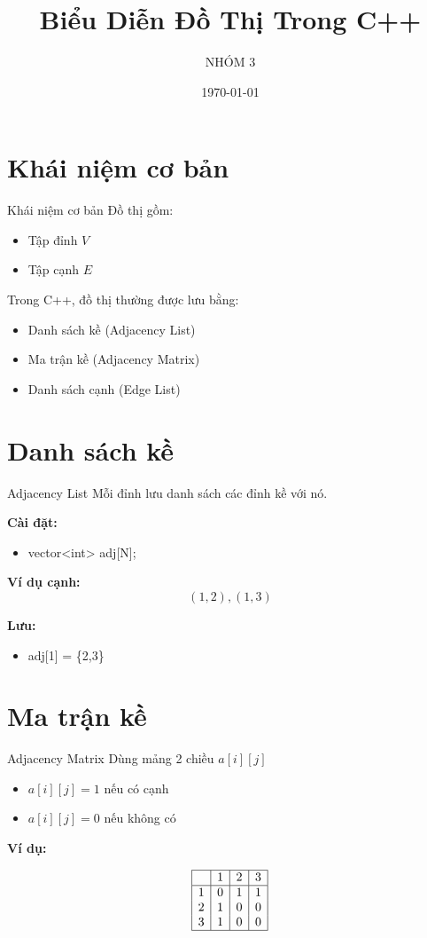 \documentclass{beamer}
\title{Biểu Diễn Đồ Thị Trong C++}
\author{NHÓM 3}
\date{\today}
\begin{document}
\frame{\titlepage}

\section{Khái niệm cơ bản}
\begin{frame}{Khái niệm cơ bản}
Đồ thị gồm:
\begin{itemize}
    \item Tập đỉnh $V$
    \item Tập cạnh $E$
\end{itemize}

Trong C++, đồ thị thường được lưu bằng:
\begin{itemize}
    \item Danh sách kề (Adjacency List)
    \item Ma trận kề (Adjacency Matrix)
    \item Danh sách cạnh (Edge List)
\end{itemize}
\end{frame}

\section{Danh sách kề}
\begin{frame}{Adjacency List}
Mỗi đỉnh lưu danh sách các đỉnh kề với nó.

\textbf{Cài đặt:}
\begin{itemize}
    \item vector<int> adj[N];
\end{itemize}

\textbf{Ví dụ cạnh:}
\[
(1,2), (1,3)
\]

\textbf{Lưu:}
\begin{itemize}
    \item adj[1] = \{2,3\}
\end{itemize}
\end{frame}

\section{Ma trận kề}
\begin{frame}{Adjacency Matrix}
Dùng mảng 2 chiều $a[i][j]$

\begin{itemize}
    \item $a[i][j] = 1$ nếu có cạnh
    \item $a[i][j] = 0$ nếu không có
\end{itemize}

\textbf{Ví dụ:}

\small
\[
\begin{array}{|c|c|c|c|}
\hline
 & 1 & 2 & 3 \\
\hline
1 & 0 & 1 & 1 \\
2 & 1 & 0 & 0 \\
3 & 1 & 0 & 0 \\
\hline
\end{array}
\]
\end{frame}
\end{document}

